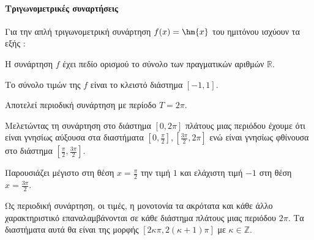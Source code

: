 \documentclass[12pt,landscape]{article}
\begin{document}
\begin{multicols}{3}
\paragraph{Τριγωνομετρικές συναρτήσεις}
Για την απλή τριγωνομετρική συνάρτηση $ f(x)=\hm{x} $ του ημιτόνου ισχύουν τα εξής :
\begin{alist}
\item Η συνάρτηση $ f $ έχει πεδίο ορισμού το σύνολο των πραγματικών αριθμών $ \mathbb{R} $.
\item Το σύνολο τιμών της $ f $ είναι το κλειστό διάστημα $ [-1,1] $.
\item Αποτελεί περιοδική συνάρτηση με περίοδο $ T=2\pi $.
\item Μελετώντας τη συνάρτηση στο διάστημα $ [0,2\pi] $ πλάτους μιας περιόδου έχουμε ότι είναι γνησίως αύξουσα στα διαστήματα $ \left[ 0,\frac{\pi}{2}\right] ,\left[ \frac{3\pi}{2},2\pi\right]  $ ενώ είναι γνησίως φθίνουσα στο διάστημα $ \left[ \frac{\pi}{2},\frac{3\pi}{2}\right]  $.
\item Παρουσιάζει μέγιστο στη θέση $ x=\frac{\pi}{2} $ την τιμή $ 1 $ και ελάχιστη τιμή $ -1 $ στη θέση $ x=\frac{3\pi}{2} $.
\end{alist}
\begin{center}
\end{center}
\begin{alist}[resume]
\item Ως περιοδική συνάρτηση, οι τιμές, η μονοτονία τα ακρότατα και κάθε άλλο χαρακτηριστικό επαναλαμβάνονται σε κάθε διάστημα πλάτους μιας περιόδου $ 2\pi $. Τα διαστήματα αυτά θα είναι της μορφής $ [2\kappa\pi,2\left( \kappa+1\right)\pi] $ με $ \kappa\in\mathbb{Z} $.

\end{alist}
\end{multicols}
\end{document}
